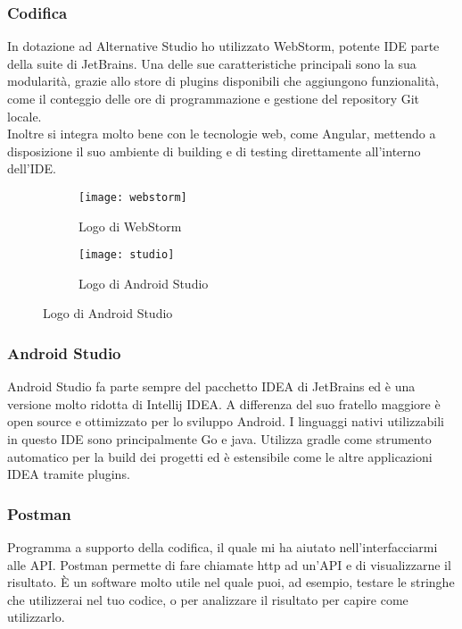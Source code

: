 \subsubsection{Codifica}
In dotazione ad Alternative Studio ho utilizzato WebStorm, potente IDE parte della suite di JetBrains. Una delle sue caratteristiche
principali sono la sua modularità, grazie allo store di plugins disponibili che aggiungono funzionalità, come il conteggio delle ore di
programmazione e gestione del repository \gls{Git} locale. \\
Inoltre si integra molto bene con le tecnologie web, come Angular, mettendo a disposizione il suo ambiente di building e di testing direttamente all'interno dell'IDE.

\begin{figure}[htbp]
	\begin{subfigure}{0.5\textwidth}
		\texttt{[image: webstorm]}
		\caption{Logo di WebStorm}
	\end{subfigure}
	\begin{subfigure}{0.5\textwidth}
		\texttt{[image: studio]}
		\caption{Logo di Android Studio}
	\end{subfigure}
\end{figure}

\subsubsection{Android Studio}
Android Studio fa parte sempre del pacchetto IDEA di JetBrains ed è una versione molto ridotta di Intellij IDEA. A differenza del suo
fratello maggiore è open source e ottimizzato per lo sviluppo Android. I linguaggi nativi utilizzabili in questo IDE sono principalmente
\gls{Go} e \gls{java}. Utilizza gradle come strumento automatico per la build dei progetti ed è estensibile come le altre applicazioni IDEA
tramite plugins.

\subsubsection{Postman}
Programma a supporto della codifica, il quale mi ha aiutato nell'interfacciarmi alle API. Postman permette di fare chiamate \gls{http} ad
un'API e di visualizzarne il risultato. È un software molto utile nel quale puoi, ad esempio, testare le stringhe che utilizzerai nel tuo
codice, o per analizzare il risultato per capire come utilizzarlo.
